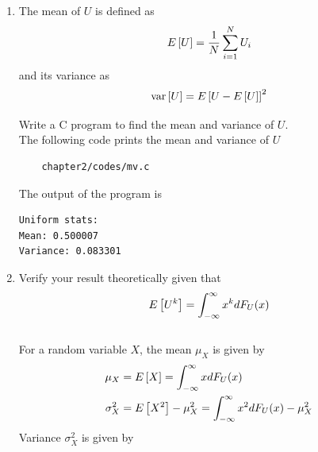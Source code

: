 \begin{enumerate}
\item
\label{prob:print_uni}
The mean of $U$ is defined as
%
\begin{equation}
E{}\left[U\right] = \frac{1}{N}\sum_{i=1}^{N}U_i
\end{equation}
%
and its variance as
%
\begin{equation}
\text{var}{}\left[U\right] = E{}\left[U- E{}\left[U\right]\right]^2 
\end{equation}

Write a C program to  find the mean and variance of $U$.\\
\solution 
%
%
%
%
The following code prints the mean and variance of $U$
\begin{lstlisting}
	chapter2/codes/mv.c
\end{lstlisting}
The output of the program is
\begin{lstlisting}
Uniform stats:
Mean: 0.500007
Variance: 0.083301
\end{lstlisting}

\item Verify your result theoretically given that
%
\begin{equation}
E{}\left[U^k\right] = \int_{-\infty}^{\infty}x^kdF_{U}(x)
\end{equation}\\
\solution For a random variable $X$, the mean $\mu_X$ is given by
\begin{align}
	\label{eq:mean_exp}
	\mu_X &= E{}\left[X\right] = \int_{-\infty}^{\infty}xdF_{U}(x) \\
	\label{eq:var_exp}
	\sigma_X^2 &= E{}\left[X^2\right] - \mu_X^2 = \int_{-\infty}^{\infty}x^2dF_{U}(x) - \mu_X^2
\end{align} 
Variance $\sigma_X^2$ is given by
 

\end{enumerate}
